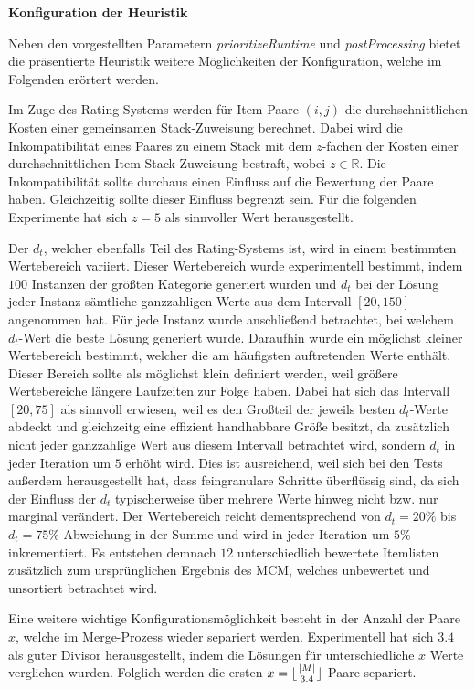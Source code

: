\textbf{Konfiguration der Heuristik}

Neben den vorgestellten Parametern \textit{prioritizeRuntime} und \textit{postProcessing} bietet
die präsentierte Heuristik weitere Möglichkeiten der Konfiguration, welche im Folgenden erörtert werden.

Im Zuge des Rating-Systems werden für Item-Paare $(i, j)$ die durchschnittlichen Kosten einer gemeinsamen
Stack-Zuweisung berechnet. Dabei wird die Inkompatibilität eines Paares zu einem Stack mit dem $z$-fachen
der Kosten einer durchschnittlichen Item-Stack-Zuweisung bestraft, wobei $z \in \mathbb{R}$.
Die Inkompatibilität sollte durchaus einen Einfluss auf die Bewertung der Paare haben.
Gleichzeitig sollte dieser Einfluss begrenzt sein. Für die folgenden Experimente hat sich $z = 5$ als sinnvoller Wert herausgestellt.

Der  $d_t$, welcher ebenfalls Teil des Rating-Systems ist, wird in einem bestimmten
Wertebereich variiert. Dieser Wertebereich wurde experimentell bestimmt, indem $100$ Instanzen der größten Kategorie generiert
wurden und $d_t$ bei der Lösung jeder Instanz sämtliche ganzzahligen Werte aus dem Intervall $[20, 150]$ angenommen hat.
Für jede Instanz wurde anschließend betrachtet, bei welchem $d_t$-Wert die beste Lösung generiert wurde.
Daraufhin wurde ein möglichst kleiner Wertebereich bestimmt, welcher die am häufigsten auftretenden Werte enthält.
Dieser Bereich sollte als möglichst klein definiert werden, weil größere Wertebereiche längere Laufzeiten zur Folge haben.
Dabei hat sich das Intervall $[20, 75]$ als sinnvoll erwiesen, weil es den Großteil der jeweils besten $d_t$-Werte
abdeckt und gleichzeitg eine effizient handhabbare Größe besitzt, da zusätzlich nicht jeder ganzzahlige Wert aus diesem Intervall betrachtet wird, sondern $d_t$ in jeder Iteration um $5$ erhöht wird. Dies ist ausreichend, weil sich bei den Tests außerdem herausgestellt hat, dass feingranulare Schritte überflüssig sind, da sich der Einfluss der $d_t$ typischerweise über mehrere Werte hinweg nicht bzw. nur marginal verändert. Der Wertebereich reicht dementsprechend von
$d_t = 20 \%$ bis $d_t = 75 \%$ Abweichung in der Summe und wird in jeder Iteration um $5 \%$ inkrementiert.
Es entstehen demnach $12$ unterschiedlich bewertete Itemlisten zusätzlich zum ursprünglichen Ergebnis des \textsc{MCM},
welches unbewertet und unsortiert betrachtet wird.

Eine weitere wichtige Konfigurationsmöglichkeit besteht in der Anzahl der Paare $x$, welche im Merge-Prozess wieder
separiert werden. Experimentell hat sich $3.4$ als guter Divisor herausgestellt, indem die Lösungen für unterschiedliche $x$ Werte verglichen wurden. Folglich werden die ersten $x = \lfloor\frac{|M|}{3.4}\rfloor$ Paare separiert.

